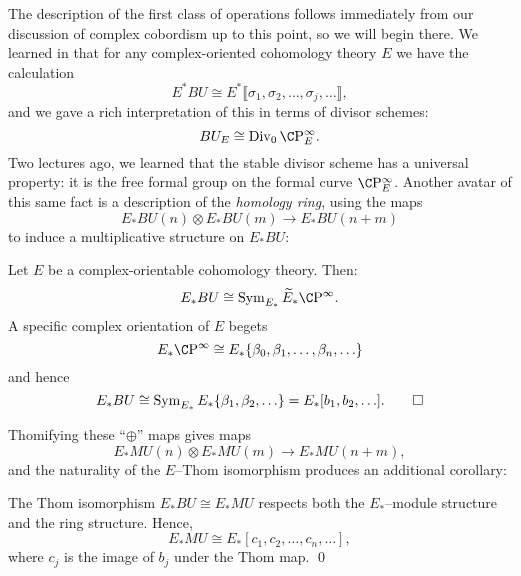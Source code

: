 The description of the first class of operations follows immediately from our discussion of complex cobordism up to this point, so we will begin there.  We learned in  that for any complex-oriented cohomology theory $E$ we have the calculation \[E^* BU \cong E^*\llbracket \sigma_1, \sigma_2, \ldots, \sigma_j, \ldots\rrbracket,\] and we gave a rich interpretation of this in terms of divisor schemes: \[BU_E \cong \Div_0 \CP^\infty_E.\]  Two lectures ago, we learned that the stable divisor scheme has a universal property: it is the free formal group on the formal curve $\CP^\infty_E$.  Another avatar of this same fact is a description of the \emph{homology ring}, using the maps \[E_* BU(n) \otimes E_* BU(m) \to E_* BU(n+m)\] to induce a multiplicative structure on $E_* BU$:
\begin{corollary}
Let $E$ be a complex-orientable cohomology theory. Then: \[E_* BU \cong \Sym_{E_*} \widetilde E_* \CP^\infty.\]   A specific complex orientation of $E$ begets \[E_* \CP^\infty \cong E_*\{\beta_0, \beta_1, \ldots, \beta_n, \ldots\}\] and hence \[E_* BU \cong \operatorname{Sym}_{E_*} E_*\{\beta_1, \beta_2, \ldots\} = E_*[b_1, b_2, \ldots]. \qed\]
\end{corollary} 

Thomifying these ``$\oplus$'' maps gives maps \[E_* MU(n) \otimes E_* MU(m) \to E_* MU(n+m),\] and the naturality of the $E$--Thom isomorphism produces an additional corollary:
\begin{corollary}
The Thom isomorphism $E_* BU \cong E_* MU$ respects both the $E_*$--module structure and the ring structure.  Hence, \[E_* MU \cong E_*[c_1, c_2, \ldots, c_n, \ldots],\] where $c_j$ is the image of $b_j$ under the Thom map. \qed
\end{corollary}


